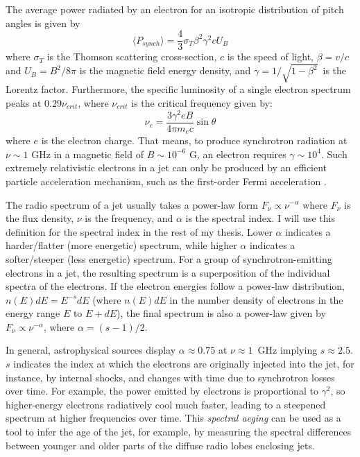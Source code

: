 The average power radiated by an electron for an isotropic distribution of pitch angles is given by 
\begin{equation}\label{eq:synch_pow}
    \langle  P_{synch} \rangle=\frac{4}{3}\sigma_T\beta^2\gamma^2cU_B
\end{equation}
where $\sigma_T$ is the Thomson scattering cross-section, $c$ is the speed of light, $\beta=v/c$ and $U_B=B^2/8\pi$ is the magnetic field energy density, and $\gamma=1/\sqrt{1-\beta^2}$~is the Lorentz factor. Furthermore, 
the specific luminosity of a single electron spectrum peaks at $0.29\nu_{crit}$, where $\nu_{crit}$ is the critical frequency given by:
\begin{equation}
    \nu_c = \frac{3\gamma^2eB}{4\pi m_e c}\sin{\theta}
\end{equation}
where $e$ is the electron charge. That means, to produce synchrotron radiation at $\nu\sim1$ GHz in a magnetic field of $B\sim10^{-6}$ G, an electron  requires $\gamma\sim10^{4}$. Such extremely relativistic electrons in a jet can only be produced by an efficient particle acceleration mechanism, such as the first-order Fermi acceleration \citep{1949PhRv...75.1169F}.

The radio spectrum of a jet usually takes a power-law form $F_\nu\propto \nu^{-\alpha}$ where $F_\nu$ is the flux density,  $\nu$ is the frequency, and $\alpha$ is the spectral index. I will use this definition for the spectral index in the rest of my thesis. Lower $\alpha$ indicates a harder/flatter (more energetic) spectrum, while higher $\alpha$ indicates a softer/steeper (less energetic) spectrum. For a group of synchrotron-emitting electrons in a jet, the resulting spectrum is a superposition of the individual spectra of the electrons. If the electron energies follow a power-law distribution, $n(E)dE=E^{-s}dE$ (where $n(E)dE$ in the number density of electrons in the energy range $E \text{~to~} E+dE$), the final spectrum is also a power-law given by $F_\nu\propto \nu^{-\alpha}$, where $\alpha=(s-1)/2$.

In general, astrophysical sources display $\alpha\approx0.75$ at $\nu\approx1$~GHz implying $s\approx2.5$. $s$ indicates the index at which the electrons are originally injected into the jet, for instance, by internal shocks, and changes with time due to synchrotron losses over time. For example, the power emitted by electrons is proportional to $\gamma^2$, so higher-energy electrons radiatively cool much faster, leading to a steepened spectrum at higher frequencies over time. This \textit{spectral aeging} can be used as a tool to infer the age of the jet, for example, by measuring the spectral differences between younger and older parts of the diffuse radio lobes enclosing jets\citep[e.g.,][]{Harwood_2015}.


